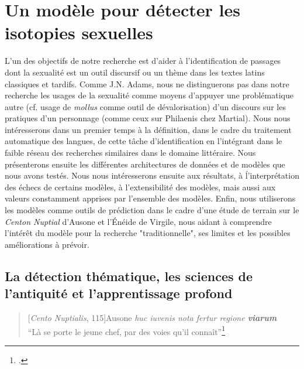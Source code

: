\chapter{Un modèle pour détecter les isotopies sexuelles}

L'un des objectifs de notre recherche est d'aider à l'identification de passages dont la sexualité est un outil discursif ou un thème dans les textes latins classiques et tardifs. Comme J.N. Adams, nous ne distinguerons pas dans notre recherche les usages de la sexualité comme moyens d'appuyer une problématique autre (cf. usage de \textit{mollus} comme outil de dévalorisation) d'un discours sur les pratiques d'un personnage (comme ceux sur Philaenis chez Martial). Nous nous intéresserons dans un premier temps à la définition, dans le cadre du traitement automatique des langues, de cette tâche d'identification en l'intégrant dans le faible réseau des recherches similaires dans le domaine littéraire. Nous présenterons ensuite les différentes architectures de données et de modèles que nous avons testés. Nous nous intéresserons ensuite aux résultats, à ĺ'interprétation des échecs de certains modèles, à l'extensibilité des modèles, mais aussi aux valeurs constamment apprises par l'ensemble des modèles. Enfin, nous utiliserons les modèles comme outils de prédiction dans le cadre d'une étude de terrain sur le \textit{Centon Nuptial} d'Ausone et l'Énéide de Virgile, nous aidant à comprendre l'intérêt du modèle pour la recherche "traditionnelle", ses limites et les possibles améliorations à prévoir.

\section{La détection thématique, les sciences de l'antiquité et l'apprentissage profond}


\begin{quote}[\textit{Cento Nuptialis}, 115]{Ausone}
    \textit{huc iuvenis nota fertur regione \textbf{viarum}} \\
    \enquote{Là se porte le jeune chef, par des voies qu'il connaît}\footcite{ausone_d_2010}
\end{quote}

